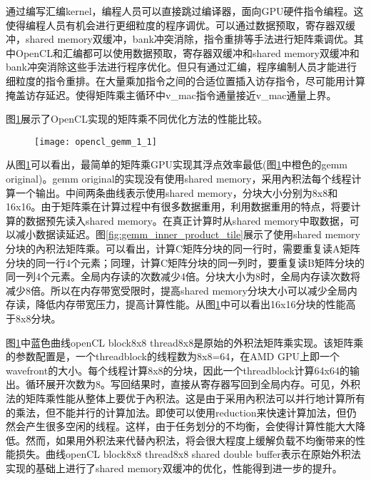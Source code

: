 通过编写汇编kernel，编程人员可以直接跳过编译器，面向GPU硬件指令编程。这使得编程人员有机会进行更细粒度的程序调优。可以通过数据预取，寄存器双缓冲，shared memory双缓冲，bank冲突消除，指令重排等手法进行矩阵乘调优。其中OpenCL和汇编都可以使用数据预取，寄存器双缓冲和shared memory双缓冲和bank冲突消除这些手法进行程序优化。但只有通过汇编，程序编制人员才能进行细粒度的指令重排。在大量乘加指令之间的合适位置插入访存指令，尽可能用计算掩盖访存延迟。使得矩阵乘主循环中v\_mac指令通量接近v\_mac通量上界。

图\ref{fig:opencl_gemm_1_1}展示了OpenCL实现的矩阵乘不同优化方法的性能比较。

\begin{figure}[htbp]
	\centering
	\texttt{[image: opencl\_gemm\_1\_1]}
	\label{fig:opencl_gemm_1_1}
\end{figure}

从图\ref{fig:opencl_gemm_1_1}可以看出，最简单的矩阵乘GPU实现其浮点效率最低(图\ref{fig:opencl_gemm_1_1}中橙色的gemm original)。gemm original的实现没有使用shared memory，采用內积法每个线程计算一个输出。中间两条曲线表示使用shared memory，分块大小分别为8x8和16x16。由于矩阵乘在计算过程中有很多数据重用，利用数据重用的特点，将要计算的数据预先读入shared memory。在真正计算时从shared memory中取数据，可以减小数据读延迟。图\ref{fig:gemm_inner_product_tile}展示了使用shared memory分块的內积法矩阵乘。可以看出，计算C矩阵分块的同一行时，需要重复读A矩阵分块的同一行4个元素；同理，计算C矩阵分块的同一列时，要重复读B矩阵分块的同一列4个元素。全局内存读的次数减少4倍。分块大小为8时，全局内存读次数将减少8倍。所以在内存带宽受限时，提高shared memory分块大小可以减少全局内存读，降低内存带宽压力，提高计算性能。从图\ref{fig:opencl_gemm_1_1}中可以看出16x16分块的性能高于8x8分块。

图\ref{fig:opencl_gemm_1_1}中蓝色曲线openCL block8x8 thread8x8是原始的外积法矩阵乘实现。该矩阵乘的参数配置是，一个threadblock的线程数为8x8=64，在AMD GPU上即一个wavefront的大小。每个线程计算8x8的分块，因此一个threadblock计算64x64的输出。循环展开次数为8。写回结果时，直接从寄存器写回到全局内存。可见，外积法的矩阵乘性能从整体上要优于內积法。这是由于采用內积法可以并行地计算所有的乘法，但不能并行的计算加法。即使可以使用reduction来快速计算加法，但仍然会产生很多空闲的线程。这样，由于任务划分的不均衡，会使得计算性能大大降低。然而，如果用外积法来代替內积法，将会很大程度上缓解负载不均衡带来的性能损失。曲线openCL block8x8 thread8x8 shared double buffer表示在原始外积法实现的基础上进行了shared memory双缓冲的优化，性能得到进一步的提升。

